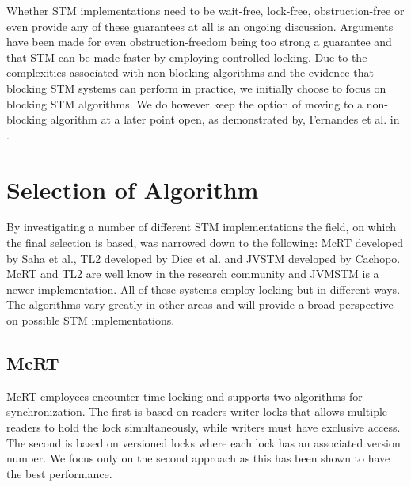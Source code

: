 Whether \ac{STM} implementations need to be wait-free, lock-free, obstruction-free or even provide any of these guarantees at all is an ongoing discussion. Arguments have been made for even obstruction-freedom being too strong a guarantee and that \ac{STM} can be made faster by employing controlled locking\cite{ennals2006software}. Due to the complexities associated with non-blocking algorithms\cite{al2013nonblocking}\cite[p. 61]{herlihy2012art} and the evidence that blocking \ac{STM} systems can perform in practice, we initially choose to focus on blocking \ac{STM} algorithms. We do however keep the option of moving to a non-blocking algorithm at a later point open, as demonstrated by, Fernandes et al. in \cite{fernandes2011lock}.



\section{Selection of Algorithm}

By investigating a number of different \ac{STM} implementations the field, on which the final selection is based, was narrowed down to the following: McRT \cite{saha2006mcrt} developed by Saha et al., TL2 developed by Dice et al. and JVSTM developed by Cachopo. McRT and TL2 are well know in the research community and JVMSTM is a newer implementation. All of these systems employ locking but in different ways. The algorithms vary greatly in other areas and will provide a broad perspective on possible \ac{STM} implementations.

\subsection{McRT}
\label{sec:stm_impl_mcrt}
McRT employees encounter time locking and supports two algorithms for synchronization\cite[p. 189]{saha2006mcrt}. The first is based on readers-writer locks that allows multiple readers to hold the lock simultaneously, while writers must have exclusive access\cite[p. 189]{saha2006mcrt}. The second is based on versioned locks where each lock has an associated version number\cite[p. 108]{harris2010transactional}. We focus only on the second approach as this has been shown to have the best performance\cite[p. 190]{saha2006mcrt}. 

